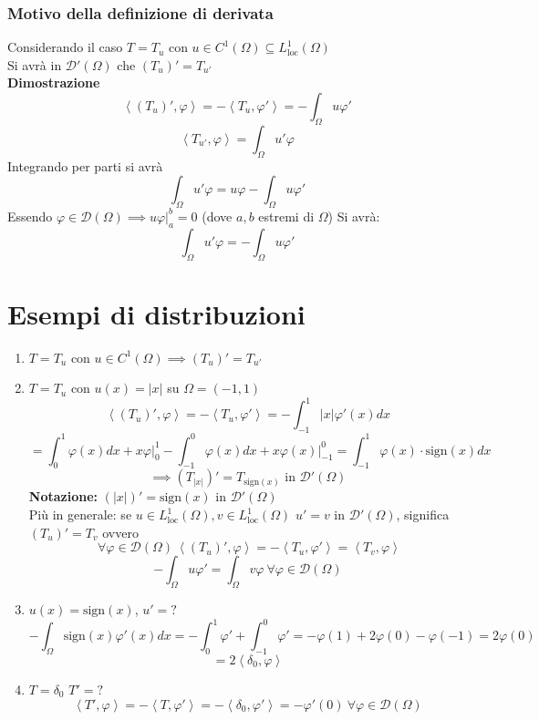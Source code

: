 \subsubsection{Motivo della definizione di derivata}
Considerando il caso $T=T_u$ con $u\in C^1(\Omega)\subseteq  L^1_{\text{loc}}(\Omega)$
\\Si avrà in $\mathcal D'(\Omega)$ che $(T_u)'=T_{u'}$ 
\\\textbf{Dimostrazione} 
\[\left<(T_u)', \varphi \right> = -\left<T_u,\varphi' \right> =-\int_{\Omega}^{} u\varphi'\]
\[\left<T_{u'}, \varphi \right> = \int_{\Omega}^{} u'\varphi\]
Integrando per parti si avrà
\[\int_{\Omega}^{} u'\varphi = u\varphi - \int_{\Omega}^{} u\varphi'\]
Essendo $\varphi \in \mathcal D(\Omega)\implies u\varphi|_a^b=0$ (dove $a,b$ estremi di $\Omega$)
Si avrà:
\[\int_{\Omega}^{} u'\varphi=-\int_{\Omega}^{} u\varphi'\]  


\section{Esempi di distribuzioni}
\begin{enumerate}
	\item $T=T_u$ con $u\in C^1(\Omega)\implies (T_u)'=T_{u'}$ 
	\item $T=T_u$ con $u(x)=|x|$ su $\Omega=(-1,1)$ 
		\[\left<(T_u)',\varphi \right> =- \left<T_u,\varphi' \right> =-\int_{-1}^{1} |x|\varphi'(x)dx\]
		\[=\int_{0}^{1} \varphi(x)dx+x\varphi \bigg|_0^1-\int_{-1}^{0} \varphi(x)dx+x\varphi(x)\bigg|_{-1}^0=\int_{-1}^{1} \varphi(x)\cdot \text{sign}(x)dx\]
		\[\implies (T_{|x|})'=T_{\text{sign}(x)}\text{ in }\mathcal D'(\Omega) \]
		\textbf{Notazione:} $(|x|)'=\text{sign}(x)\text{ in }\mathcal D'(\Omega)$ 
		\\Più in generale: se $u\in L^1_{\text{loc}}(\Omega),v\in L^1_{\text{loc}}(\Omega)$  $u'=v\text{ in }\mathcal D'(\Omega)$, significa $(T_u)'=T_v$ ovvero
		\[ \ \forall \varphi\in \mathcal D(\Omega)\ \left<(T_u)',\varphi \right> = - \left<T_u,\varphi' \right> = \left<T_v,\varphi \right> \]
			\[-\int_{\Omega}^{} u\varphi'=\int_{\Omega}^{} v\varphi\ \forall \varphi\in \mathcal D(\Omega)  \]
		\item $u(x)=\text{sign}(x)$, $u'=?$ 
			\[-\int_{\Omega}^{} \text{sign}(x)\varphi'(x)dx=-\int_{0}^{1} \varphi'+\int_{-1}^{0} \varphi'=-\varphi(1)+2\varphi(0)-\varphi(-1)=2\varphi(0)\]
			\[=2 \left<\delta_0,\varphi \right>\]
\item $T=\delta_0$ $T'=?$ 
	\[\left<T',\varphi \right> = - \left<T,\varphi' \right> =- \left<\delta_0,\varphi' \right> =-\varphi'(0)\ \forall \varphi\in \mathcal D(\Omega)\]
\end{enumerate}

